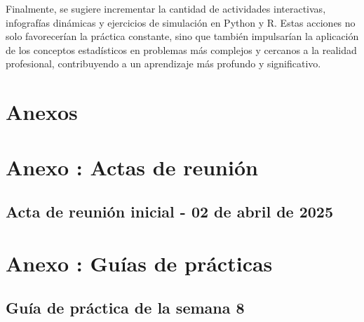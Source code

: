 \documentclass[letter,oneside,12pt,spanish]{report}
\begin{document}
Finalmente, se sugiere incrementar la cantidad de actividades interactivas, infografías dinámicas y ejercicios de simulación en Python y R. Estas acciones no solo favorecerían la práctica constante, sino que también impulsarían la aplicación de los conceptos estadísticos en problemas más complejos y cercanos a la realidad profesional, contribuyendo a un aprendizaje más profundo y significativo.

\newpage

%
%

\printbibliography

\nocite{poniszewska-maranda, burns-kubernetes, torres-bosch-microservicios, armstrong2015,kubevirtio, docker2023, kubelet-doc, namespace-article}
\newpage

\appendix

\chapter*{Anexos}


\chapter*{Anexo \thechapter: Actas de reunión}
\label{anexo:actas}

\section*{Acta de reunión inicial - 02 de abril de 2025}
\label{anexo:acta-abril-2025}



\chapter*{Anexo \thechapter: Guías de prácticas}
\label{anexo:Guía Semana 8}

\section*{Guía de práctica de la semana 8}
\label{anexo:Guía-Semana-8}




\end{document}
